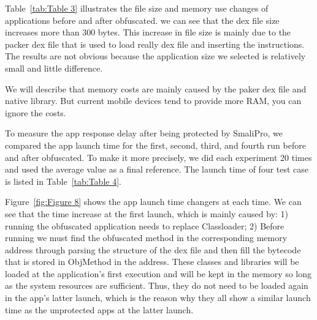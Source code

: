 Table~\ref{tab:Table 3} illustrates the file size and memory use changes of applications before and after obfuscated. we can see that the dex file size increases more than 300 bytes. This increase in file size is mainly due to the packer dex file that is used to load really dex file and inserting the instructions. The results are not obvious because the application size we selected is relatively small and little difference.

We will describe that memory costs are mainly caused by the paker dex file and native library. But current mobile devices tend to provide more RAM, you can ignore the costs.

To measure the app response delay after being protected by SmaliPro, we compared the app launch time for the first, second, third, and fourth run before and after obfuscated. To make it more precisely, we did each experiment 20 times and used the average value as a final reference. The launch time of four test case is listed in Table~\ref{tab:Table 4}.

Figure~\ref{fig:Figure 8} shows the app launch time changers at each time. We can see that the time increase at the first launch, which is mainly caused by: 1) running the obfuscated application needs to replace Classloader; 2) Before running we must find the obfuscated method in the corresponding memory address through parsing the structure of the dex file and then fill the bytecode that is stored in ObjMethod in the address. These classes and libraries will be loaded at the application's first execution and will be kept in the memory so long as the system resources are sufficient. Thus, they do not need to be loaded again in the app's latter launch, which is the reason why they all show a similar launch time as the unprotected apps at the latter launch.

